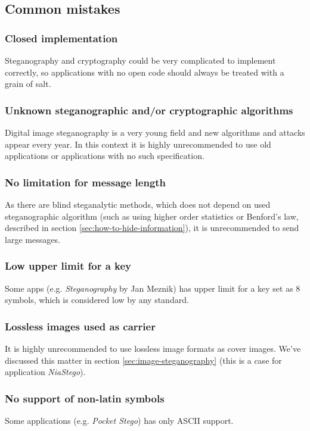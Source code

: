 \subsection{Common mistakes}

\subsubsection{Closed implementation}
Steganography and cryptography could be very complicated to implement correctly, so applications with
no open code should always be treated with a grain of salt.

\subsubsection{Unknown steganographic and/or cryptographic algorithms}
Digital image steganography is a very young field and new algorithms and attacks appear every year.
In this context it is highly unrecommended to use old applications or applications with no such 
specification.

\subsubsection{No limitation for message length}
As there are blind steganalytic methods, which does not depend on used steganographic algorithm 
(such as using higher order statistics or Benford's law, described in section \ref{sec:how-to-hide-information}),
it is unrecommended to send large messages.

\subsubsection{Low upper limit for a key}
Some apps (e.g. \emph{Steganography} by Jan Meznik) has upper limit for a key set as $8$ symbols, which is considered low
by any standard.

\subsubsection{Lossless images used as carrier}
It is highly unrecommended to use lossless image formats as cover images. We've discussed this matter in section \ref{sec:image-steganography}
(this is a case for application \emph{NiaStego}).

\subsubsection{No support of non-latin symbols}
Some applications (e.g. \emph{Pocket Stego}) has only ASCII support.

